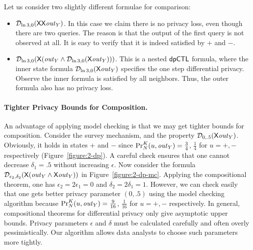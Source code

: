 Let us consider two slightly different formulae for comparison:
\begin{itemize}
\item $\dpriv{\ln 3}{0} (\X \X \mathit{out}_Y)$. In this case we claim
  there is no privacy loss, even though there are two queries. The reason is that the output of the first query is not observed at all. It is easy to verify that it is indeed satisfied by $+$ and $-$.
\item $\dpriv{\ln 3}{0} (\X (\mathit{out}_Y\wedge \dpriv{\ln 3}{0}(\X \mathit{out}_Y)))$. This is a nested $\dpCTL$ formula, where the inner state formula $\dpriv{\ln 3}{0}(\X \mathit{out}_Y)$ specifies the one step differential privacy. Observe the inner formula is satisfied by all neighbors. Thus, the outer formula also has no privacy loss.
\end{itemize}

\paragraph{Tighter Privacy Bounds for Composition.}
An advantage of applying model checking is that we may get tighter
bounds for composition. Consider the survey mechanism, and the
property $\dpriv{0}{.5} (\X \mathit{out}_Y)$. Obviously, it holds in
states $+$ and $-$ since $\myPr{u}{K}{N}{\mathit{out}_Y} =
\frac{3}{4}$, $\frac{1}{4}$ for $u = +, -$ respectively (Figure~\ref{figure:2-dp}). A careful check ensures that one cannot decrease  $\delta_1=.5$ without increasing $\epsilon$.
Now consider the formula $\dpriv{\epsilon_2}{\delta_2} (\X
(\mathit{out}_Y\wedge \X \mathit{out}_Y))$ in
Figure~\ref{figure:2-dp-mc}. Applying the
compositional theorem, one has $\epsilon_2=2\epsilon_1=0$ and
$\delta_2=2\delta_1=1$. However, we can check easily that one gets
better privacy parameter $(0,.5)$ using the model checking algorithm
because $\myPr{u}{K}{N}{\mathit{out}_Y} = \frac{9}{16}$,
$\frac{1}{16}$ for $u = +, -$ respectively.
In general, compositional theorems for differential privacy only give
asymptotic upper bounds. Privacy parameters $\epsilon$ and $\delta$
must be calculated carefully and often overly pessimistically. Our
algorithm allows data analysts to choose such parameters more
tightly.

